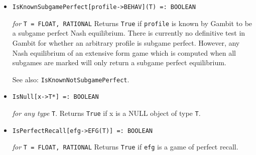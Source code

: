 \begin{itemize}


\item
\protect \large \begin{verbatim}
IsKnownSubgamePerfect[profile->BEHAV](T) =: BOOLEAN
\end{verbatim}\normalsize

{\it for} {\tt T = FLOAT, RATIONAL}
\bd
Returns \verb+True+ if \verb+profile+
is known by Gambit to be a subgame perfect Nash
equilibrium.  There is currently no
definitive test in Gambit for whether an arbitrary profile is subgame
perfect.  However, any Nash equilibrium of an extensive form game which
is computed when all subgames are marked will only return a subgame
perfect equilibrium.  
\item [See also:] \verb+IsKnownNotSubgamePerfect+.
\ed

\item
\protect \large \begin{verbatim}
IsNull[x->T*] =: BOOLEAN
\end{verbatim}\normalsize

{\it for any type } {\tt T}.
\bd
Returns \verb+True+ if x is a NULL object of type \verb+T+.  
\ed

\item
\protect \large \begin{verbatim}
IsPerfectRecall[efg->EFG(T)] =: BOOLEAN
\end{verbatim}\normalsize

{\it for} {\tt T = FLOAT, RATIONAL}
\bd 
Returns \verb+True+ if \verb+efg+ is a game of perfect recall.
\ed



\end{itemize}

